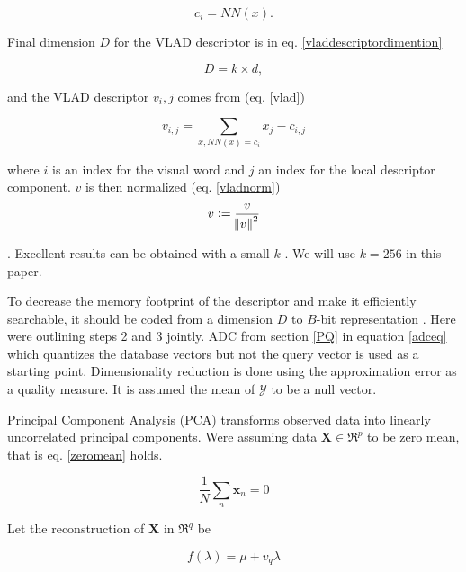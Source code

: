 \documentclass[english,12pt,a4paper,pdftex,elec,utf8]{aaltothesis}
\begin{document}
\begin{equation}
  \label{vladdescriptortovw}
c_i = NN(x).
\end{equation}

Final dimension $D$ for the VLAD descriptor is in eq. \ref{vladdescriptordimention}

\begin{equation}
  \label{vladdescriptordimention}
  D = k \times d,
\end{equation}

and the VLAD descriptor $v_i,j$ comes from (eq. \ref{vlad})

\begin{equation}
  \label{vlad}
  v_{i,j} = \sum_{x, NN(x)=c_i} x_j - c_{i,j}
\end{equation}

where $i$ is an index for the visual word and $j$ an index for the local descriptor component. $v$ is then normalized (eq. \ref{vladnorm})
\begin{equation}
  \label{vladnorm}
  v := \frac{v}{\norm{v}^2}
  \end{equation}

.\cite{Jegou2014} Excellent results can be obtained with a small $k$ \cite{Jegou2014}. We will use $k=256$ in this paper.

To decrease the memory footprint of the descriptor and make it efficiently searchable, it should be coded from a dimension $D$ to $B$-bit representation \cite{Jegou2014}. Here were outlining steps 2 and 3 jointly. ADC from section \ref{PQ} in equation \ref{adceq} which quantizes the database vectors but not the query vector is used as a starting point. Dimensionality reduction is done using the approximation error as a quality measure. It is assumed the mean of $\mathcal{Y}$ to be a null vector.\cite{Jegou2014}

Principal Component Analysis (PCA) transforms observed data into linearly uncorrelated principal components. Were assuming data $\boldsymbol{X} \in \Re^{p}$ to be zero mean, that is eq. \ref{zeromean} holds.

\begin{equation}\label{zeromean}
\frac{1}{N}\sum_n \boldsymbol{x}_n = 0
\end{equation}

Let the reconstruction of $\boldsymbol{X}$ in $\Re^{q}$ be

\begin{equation} \label{pca}
f(\lambda) = \mu + v_q\lambda
\end{equation}
\end{document}
